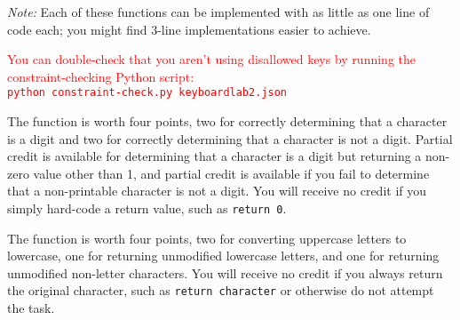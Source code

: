 \textit{Note: } Each of these functions can be implemented with as little as one line of code each;
you might find 3-line implementations easier to achieve.

\textcolor{red}{
You can double-check that you aren't using disallowed keys by running the constraint-checking Python script: \\
\texttt{python constraint-check.py keyboardlab2.json}
}

The  function is worth four points, two for correctly determining that a character is a digit and two for correctly determining that a character is not a digit.
Partial credit is available for determining that a character is a digit but returning a non-zero value other than 1, and partial credit is available if you fail to determine that a non-printable character is not a digit.
You will receive no credit if you simply hard-code a return value, such as \lstinline{return 0}.

The  function is worth four points, two for converting uppercase letters to lowercase, one for returning unmodified lowercase letters, and one for returning unmodified non-letter characters.
You will receive no credit if you always return the original character, such as \lstinline{return character} or otherwise do not attempt the task.

